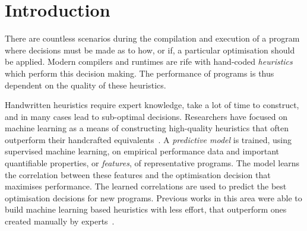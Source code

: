 \section{Introduction}

%
%
%

There are countless scenarios during the compilation and execution of a program where decisions must be made as to how, or if, a particular optimisation should be applied. Modern compilers and runtimes are rife with hand-coded \emph{heuristics} which perform this decision making. The performance of programs is thus dependent on the quality of these heuristics.

Handwritten heuristics require expert knowledge, take a lot of time to construct, and in many cases lead to sub-optimal decisions. Researchers have focused on machine learning as a means of constructing high-quality heuristics that often outperform their handcrafted equivalents~\cite{Micolet2016,Falch2015,Stephenson2005,Agakov,Cummins2016a}. A \emph{predictive model} is trained, using supervised machine learning, on empirical performance data and important quantifiable properties, or \emph{features}, of representative programs. The model learns the correlation between these features and the optimisation decision that maximises performance. The learned correlations are used to predict the best optimisation decisions for new programs. Previous works in this area were able to build machine learning based heuristics with less effort, that outperform ones created manually by experts~\cite{Grewe2013,Magni2014}.

